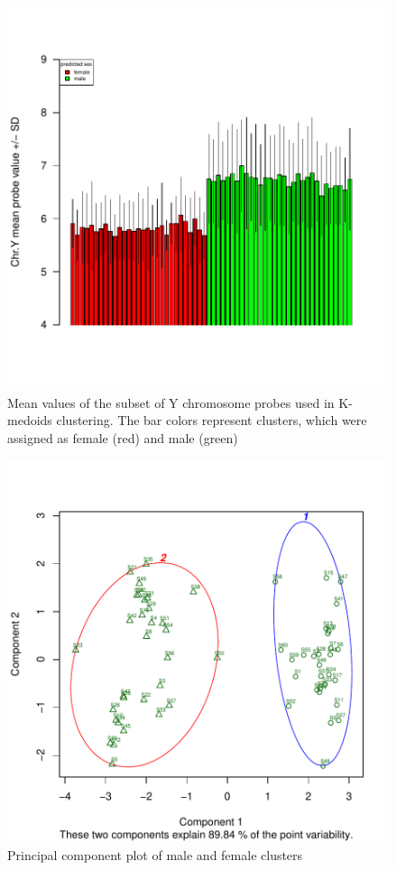 \documentclass{article}
\begin{document}
\begin{figure}
\begin{center}
\includegraphics{massiR_Vignette-fig3}
\end{center}
\caption{Mean values of the subset of Y chromosome probes used in K-medoids clustering. The bar colors represent clusters, which were assigned as female (red) and male (green)}
\label{fig:fig3}
\end{figure}

\begin{figure}
\begin{center}
\includegraphics{massiR_Vignette-fig4}
\end{center}
\caption{Principal component plot of male and female clusters}
\label{fig:fig4}
\end{figure}
\end{document}
